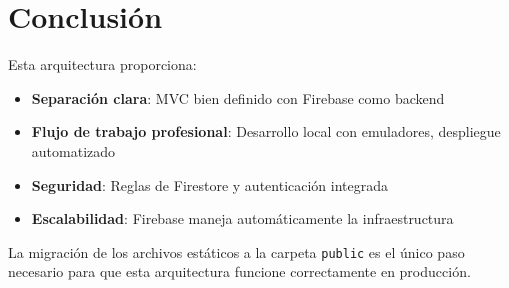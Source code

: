 \documentclass[12pt,a4paper]{article}
\begin{document}
\section{Conclusión}

Esta arquitectura proporciona:

\begin{itemize}
    \item \textbf{Separación clara}: MVC bien definido con Firebase como backend
    \item \textbf{Flujo de trabajo profesional}: Desarrollo local con emuladores, despliegue automatizado
    \item \textbf{Seguridad}: Reglas de Firestore y autenticación integrada
    \item \textbf{Escalabilidad}: Firebase maneja automáticamente la infraestructura
\end{itemize}

La migración de los archivos estáticos a la carpeta \texttt{public} es el único paso necesario para que esta arquitectura funcione correctamente en producción.
\end{document}
